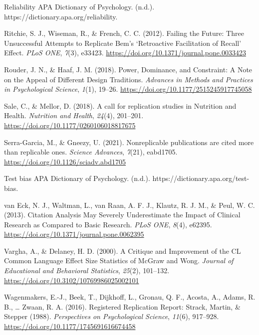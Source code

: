 \documentclass[
  english,
  man,floatsintext]{apa6}
\newlength{\cslhangindent}
\newlength{\cslentryspacingunit} %
\newenvironment{CSLReferences}[2] %
 {%
  \setlength{\parindent}{0pt}
  \ifodd #1
  \let\oldpar\par
  \def\par{\hangindent=\cslhangindent\oldpar}
  \fi
  \setlength{\parskip}{#2\cslentryspacingunit}
 }%
 {}
\begin{document}
\begin{CSLReferences}{1}{0}
\leavevmode{}%
Reliability \textendash{} {APA Dictionary} of {Psychology}. (n.d.). https://dictionary.apa.org/reliability.

\leavevmode{}%
Ritchie, S. J., Wiseman, R., \& French, C. C. (2012). Failing the {Future}: {Three Unsuccessful Attempts} to {Replicate Bem}'s {`{Retroactive Facilitation} of {Recall}'} {Effect}. \emph{PLoS ONE}, \emph{7}(3), e33423. \url{https://doi.org/10.1371/journal.pone.0033423}

\leavevmode{}%
Rouder, J. N., \& Haaf, J. M. (2018). Power, {Dominance}, and {Constraint}: {A Note} on the {Appeal} of {Different Design Traditions}. \emph{Advances in Methods and Practices in Psychological Science}, \emph{1}(1), 19--26. \url{https://doi.org/10.1177/2515245917745058}

\leavevmode{}%
Sale, C., \& Mellor, D. (2018). A call for replication studies in {Nutrition} and {Health}. \emph{Nutrition and Health}, \emph{24}(4), 201--201. \url{https://doi.org/10.1177/0260106018817675}

\leavevmode{}%
Serra-Garcia, M., \& Gneezy, U. (2021). Nonreplicable publications are cited more than replicable ones. \emph{Science Advances}, \emph{7}(21), eabd1705. \url{https://doi.org/10.1126/sciadv.abd1705}

\leavevmode{}%
Test bias \textendash{} {APA Dictionary} of {Psychology}. (n.d.). https://dictionary.apa.org/test-bias.

\leavevmode{}%
van Eck, N. J., Waltman, L., van Raan, A. F. J., Klautz, R. J. M., \& Peul, W. C. (2013). Citation {Analysis May Severely Underestimate} the {Impact} of {Clinical Research} as {Compared} to {Basic Research}. \emph{PLoS ONE}, \emph{8}(4), e62395. \url{https://doi.org/10.1371/journal.pone.0062395}

\leavevmode{}%
Vargha, A., \& Delaney, H. D. (2000). A {Critique} and {Improvement} of the {CL Common Language Effect Size Statistics} of {McGraw} and {Wong}. \emph{Journal of Educational and Behavioral Statistics}, \emph{25}(2), 101--132. \url{https://doi.org/10.3102/10769986025002101}

\leavevmode{}%
Wagenmakers, E.-J., Beek, T., Dijkhoff, L., Gronau, Q. F., Acosta, A., Adams, R. B., \ldots{} Zwaan, R. A. (2016). Registered {Replication Report}: {Strack}, {Martin}, \& {Stepper} (1988). \emph{Perspectives on Psychological Science}, \emph{11}(6), 917--928. \url{https://doi.org/10.1177/1745691616674458}


\end{CSLReferences}
\end{document}
